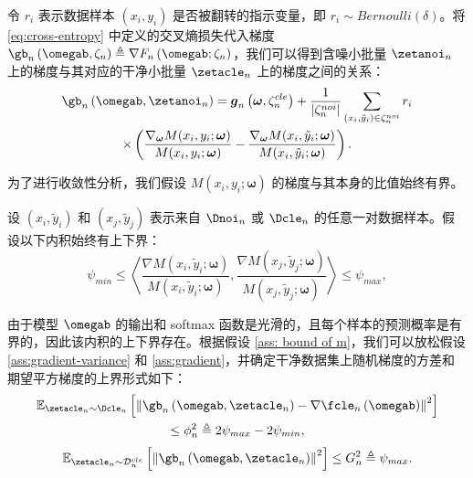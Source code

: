 令 $r_i$ 表示数据样本 $(x_i,y_i)$ 是否被翻转的指示变量，即 $r_i\sim Bernoulli(\delta)$。将 \eqref{eq:cross-entropy} 中定义的交叉熵损失代入梯度 $\gb_n\left(\omegab,\zeta_n\right)\triangleq \nabla F_n\left(\omegab;\zeta_n\right)$，我们可以得到含噪小批量 $\zetanoi_n$ 上的梯度与其对应的干净小批量 $\zetacle_n$ 上的梯度之间的关系：
\begin{multline}\label{Gradient of clean loss}
\gb_n\left(\omegab,\zetanoi_n\right) %
=\boldsymbol{g}_n\left(\boldsymbol{\omega},\zeta_n^{cle}\right)
+\frac{1}{|\zeta_n^{noi}|}\sum_{\left(x_i,\tilde{y}_i\right)\in \zeta_n^{noi}}r_i\\ \times\left(\frac{\nabla_{\boldsymbol{\omega}} M(x_i, y_i; \boldsymbol{\omega})}{M(x_i,  y_i; \boldsymbol{\omega})} -\frac{\nabla_{\boldsymbol{\omega}} M(x_i, \tilde{y}_i; \boldsymbol{\omega})}{M(x_i, \tilde{y}_i; \boldsymbol{\omega})}\right).
\end{multline}

为了进行收敛性分析，我们假设 $M(x_i, {y}_i; \boldsymbol{\omega})$ 的梯度与其本身的比值始终有界。
\begin{assumption}\label{ass: bound of m}
设 $\left(x_i,\tilde{y}_i\right)$ 和 $\left(x_j,\tilde{y}_j\right)$ 表示来自 $\Dnoi_n$ 或 $\Dcle_n$ 的任意一对数据样本。假设以下内积始终有上下界：
\begin{equation}
   \psi_{min} \leq \left\langle\frac{\nabla M(x_i, \tilde{y}_i; \boldsymbol{\omega})}{M(x_i, \tilde{y}_i; \boldsymbol{\omega})},\frac{\nabla M(x_j, \tilde{y}_j; \boldsymbol{\omega})}{M(x_j, \tilde{y}_j; \boldsymbol{\omega})}\right\rangle\leq \psi_{max},
\end{equation}
\end{assumption}

由于模型 $\omegab$ 的输出和 softmax 函数是光滑的，且每个样本的预测概率是有界的，因此该内积的上下界存在。根据假设 \ref{ass: bound of m}，我们可以放松假设 \ref{ass:gradient-variance} 和 \ref{ass:gradient}，并确定干净数据集上随机梯度的方差和期望平方梯度的上界形式如下：
\begin{multline}\label{eq:gradient-variance cross-entropy}
    \mathbb{E}_{\zetacle_n\sim \Dcle_n}\left[\left\Vert \gb_n\left(\omegab,\zetacle_n\right) - \nabla \fcle_n\left(\omegab\right) \right\Vert^2 \right] \\ \leq \phi^2_n \triangleq 2\psi_{max}-2\psi_{min},
\end{multline}
\begin{equation}\label{eq:gradient cross-entropy}
\mathbb{E}_{\zetacle_n\sim \mathcal{D}_n^{cle}}\left[\left\Vert \gb_n\left(\omegab, \zetacle_n\right) \right\Vert^2\right] \leq G_n^2 \triangleq  \psi_{max}.
\end{equation}

